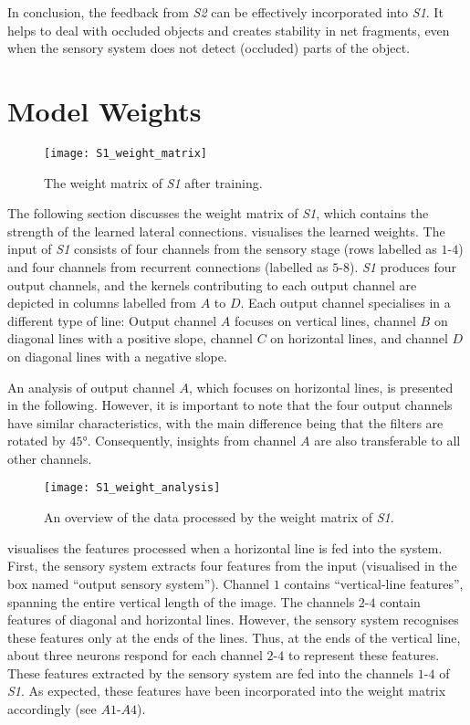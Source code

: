 In conclusion, the feedback from \emph{S2} can be effectively incorporated into \emph{S1}.
It helps to deal with occluded objects and creates stability in net fragments, even when the sensory system does not detect (occluded) parts of the object.



\section{Model Weights}
%
\begin{figure}[h]
    \centering
    \texttt{[image: S1\_weight\_matrix]}
    \caption[Weight matrix of \emph{S1} after training]{The weight matrix of \emph{S1} after training.}
\end{figure}
%
The following section discusses the weight matrix of \emph{S1}, which contains the strength of the learned lateral connections.
 visualises the learned weights. 
The input of \emph{S1} consists of four channels from the sensory stage (rows labelled as $1$-$4$) and four channels from recurrent connections (labelled as $5$-$8$).
\emph{S1} produces four output channels, and the kernels contributing to each output channel are depicted in columns labelled from $A$ to $D$.
Each output channel specialises in a different type of line: Output channel $A$ focuses on vertical lines, channel $B$ on diagonal lines with a positive slope, channel $C$ on horizontal lines, and channel $D$ on diagonal lines with a negative slope.

An analysis of output channel $A$, which focuses on horizontal lines, is presented in the following.
However, it is important to note that the four output channels have similar characteristics, with the main difference being that the filters are rotated by $45°$. Consequently, insights from channel $A$ are also transferable to all other channels.

\begin{figure}[h]
    \centering
    \texttt{[image: S1\_weight\_analysis]}
    \caption[Analysis of weight matrix]{An overview of the data processed by the weight matrix of \emph{S1}.}
\end{figure}
%
 visualises the features processed when a horizontal line is fed into the system.
First, the sensory system extracts four features from the input (visualised in the box named ``output sensory system'').
Channel $1$ contains ``vertical-line features'', spanning the entire vertical length of the image. 
The channels $2$-$4$ contain features of diagonal and horizontal lines. However, the sensory system recognises these features only at the ends of the lines.
Thus, at the ends of the vertical line, about three neurons respond for each channel $2$-$4$ to represent these features.
These features extracted by the sensory system are fed into the channels $1$-$4$ of \emph{S1}.
As expected, these features have been incorporated into the weight matrix accordingly (see $A1$-$A4$).

